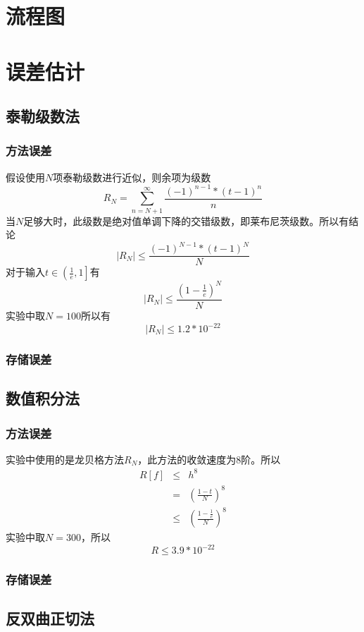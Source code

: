 \documentclass[UTF8,twocolum,titlepage]{ctexart}
\begin{document}
\section*{流程图}

\section*{误差估计}
\subsection*{泰勒级数法}
\subsubsection*{方法误差}
假设使用$N$项泰勒级数进行近似，则余项为级数$$R_N=\sum\limits_{n=N+1}^{\infty}\frac{\left(-1\right)^{n-1}*\left(t-1\right)^{n}}{n}$$
当$N$足够大时，此级数是绝对值单调下降的交错级数，即莱布尼茨级数。所以有结论$$\left|R_N\right| \le  \frac{\left(-1\right)^{N-1}*\left(t-1\right)^{N}}{N}$$对于输入$t\in\left(\frac{1}{e},1 \right]$有$$\left|R_N\right| \le \frac{\left(1-\frac{1}{e}\right)^N}{N}$$实验中取$N=100$所以有$$\left|R_N\right| \le 1.2*10^{-22}$$
\subsubsection*{存储误差}

\subsection*{数值积分法}
\subsubsection*{方法误差}
实验中使用的是龙贝格方法$R_N$，此方法的收敛速度为8阶。所以
\begin{eqnarray*}
R\left[f\right] &\le& h^8\\&=&\left(\frac{1-t}{N}\right)^8\\ &\le& \left(\frac{1-\frac{1}{e}}{N}\right)^8
\end{eqnarray*}
实验中取$N=300$，所以$$R \le 3.9*10^{-22}$$
\subsubsection*{存储误差}

\subsection*{反双曲正切法}
\end{document}
